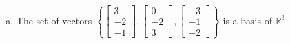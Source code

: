 \begin{exerciseAnswer}
\begin{enumerate}[(a)]
\item The set of vectors \( \left\{ \left[\begin{array}{c}
3 \\
-2 \\
-1
\end{array}\right] , \left[\begin{array}{c}
0 \\
-2 \\
3
\end{array}\right] , \left[\begin{array}{c}
-3 \\
-1 \\
-2
\end{array}\right] \right\} \) is a basis of \(\mathbb{R}^3\)
\end{enumerate}
    
\end{exerciseAnswer}
    
